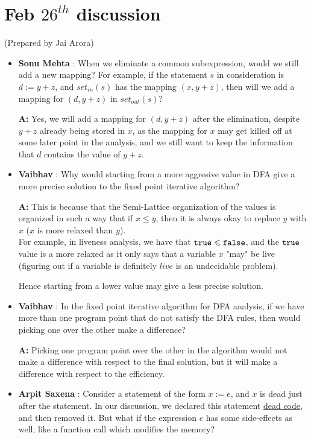 \clearpage
\section{Feb $26^{th}$ discussion}
(Prepared by Jai Arora)
\vspace{0.3cm}

\begin{itemize}
    \item \textbf{Sonu Mehta} : When we eliminate a common subexpression, would we still add a new mapping?
        For example, if the statement $s$ in consideration is $d := y + z$, and $set_{in}(s)$ has the mapping $(x, y+z)$, then will we add a mapping for $(d,y+z)$ in $set_{out}(s)$?

        \textbf{A:} Yes, we will add a mapping for $(d,y+z)$ after the elimination, despite $y+z$ already being stored in $x$, as the mapping for $x$ may get killed off at some later point in the analysis, and we still want to keep the information that $d$ contains the value of $y+z$.
    \item \textbf{Vaibhav} : Why would starting from a more aggresive value in DFA give a more precise solution to the fixed point iterative algorithm?
    
        \textbf{A:} This is because that the Semi-Lattice organization of the values is organized in such a way that if $x \leq y$, then it is always okay to replace $y$ with $x$ ($x$ is more relaxed than $y$).\\
                    For example, in liveness analysis, we have that ${\tt true} \leqslant {\tt false}$, and the ${\tt true}$ value is a more relaxed as it only says that a variable $x$ "may" be live (figuring out if a variable is definitely $live$ is an undecidable problem).

                    Hence starting from a lower value may give a less precise solution.

    \item \textbf{Vaibhav} : In the fixed point iterative algorithm for DFA analysis, if we have more than one program point that do not satisfy the DFA rules, then would picking one over the other make a difference?
    
        \textbf{A:} Picking one program point over the other in the algorithm would not make a difference with respect to the final solution, but it will make a difference with respect to the efficiency.

    \item \textbf{Arpit Saxena} : Consider a statement of the form $x := e$, and $x$ is dead just after the statement. In our discussion, we declared this statement \underline{dead code}, and then removed it. But what if the expression $e$ has some side-effects as well, like a function call which modifies the memory?
    

\end{itemize}
